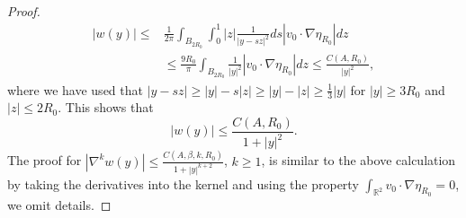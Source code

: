 \documentclass[12pt]{amsart}
\numberwithin{equation}{section}              %
\theoremstyle{remark}
\begin{document}
\begin{proof}
\begin{equation*}
				\begin{aligned}
					|w(y)| \leq 
					&\frac{1}{2\pi} \int_{B_{2R_0}}    \int_{0}^{1}|z|  \frac{1}{|y-sz|^2} ds  |v_0 \cdot \nabla  \eta_{R_0}|dz	\\
					&\leq \frac{9 R_0}{\pi} \int_{B_{2R_0}}  \frac{1}{|y|^2}|v_0 \cdot \nabla  \eta_{R_0}|dz \leq \frac{C(A,R_0)}{|y|^2},
				\end{aligned}
			\end{equation*}
			where we have used that $|y-sz|\geq |y|-s|z| \geq |y|-|z|\geq\frac{1}{3}|y|$ for $|y|\geq 3R_0$ and $|z|\leq 2R_0$.
			This shows that 
			\begin{equation*}
				|  w(y)|\leq \frac{C(A,R_0)}{1+ |y|^2}.
			\end{equation*}
			The proof for $|  \nabla^k w(y)|\leq \frac{C(A,\beta, k, R_0)}{1+|y|^{k+2}}$, $k\geq 1$, 
            is similar to the above calculation by taking the derivatives into the kernel and using the property $\int_{\mathbb{R}^2} v_0 \cdot \nabla  \eta_{R_0} = 0$,  we omit details.
			

\end{proof}
\end{document}
